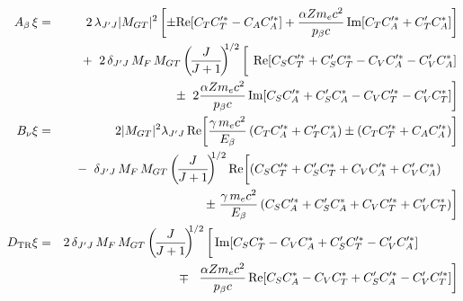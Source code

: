 \begin{eqnarray}
    \Abeta \, \xi &=& 
    	2\, \lambda_{J^\prime J} |M_{GT}|^2 \left[ \pm \textrm{Re}\!\left[ C_T C_T^{\prime *} - C_A C_A^{\prime *} \right] + \frac{\alpha Z \me c^2}{\pbeta c} \,\textrm{Im}\!\left[ C_T C_A^{\prime *} + C_T^\prime C_A^* \right] \right] 
		\nonumber \\ && + \;\; 
		2\, \delta_{J^\prime J} \, M_F\,M_{GT} \left(\! \frac{J}{J+1} \! \right)^{\!\!\! 1/2} \left[ \phantom{\frac{1}{1}\!\!\!} \,\textrm{Re} \! \left[ C_S C_T^{\prime *} +  C_S^\prime C_T^* - C_V C_A^{\prime *} - C_V^\prime C_A^* \right] 
		\right.
		\nonumber \\ && \pm \;
		\left.
		2 \frac{\alpha Z \me c^2}{\pbeta c} \,\textrm{Im}\!\left[ C_S C_A^{\prime *} + C_S^\prime C_A^* - C_V C_T^{\prime *} -C_V^\prime C_T^* \right] \right]
		\label{eq:jtw_Abetaxi}
	\\
	\Bnu \xi &=& 
		2 |M_{GT}|^2 \lambda_{J^\prime J}  \, \textrm{Re}\!\left[ \frac{\gamma \, \me c^2 }{\Ebeta}
		\left( C_T C_A^{\prime *} + C_T^\prime C_A^* \right) 
		\pm \left( C_T C_T^{\prime *} + C_A C_A^{\prime * }\right) \right]
		\nonumber \\
		&& - \;\; \delta_{J^\prime J} \, M_F\,M_{GT} \left(\! \frac{J}{J+1} \!\right)^{\!\!\! 1/2} 
		\textrm{Re} \! \left[ \left( C_S C_T^{\prime *} + C_S^\prime C_T^* + C_V C_A^{\prime *} + C_V^\prime C_A^* \right)
			\phantom{\frac{\me c^2}{\Ebeta } \!\!\!\! \!\!\!\! } \right.
		\nonumber \\ && \pm 
		\left. 
		\frac{\gamma \, \me c^2}{\Ebeta}  \left( C_S C_A^{\prime *} + C_S^\prime C_A^* + C_V C_T^{\prime *} + C_V^\prime C_T^* \right)  
		\right]
		\label{eq:jtw_Bnuxi}
	\\
	\DTR \xi &=&
		2 \, \delta_{J^\prime J} \, M_F\,M_{GT} \left(\! \frac{J}{J+1} \!\right)^{\!\!\! 1/2} \left[ \,
		\textrm{Im}\!\left[ C_S C_T^* - C_V C_A^* + C_S^\prime C_T^{\prime *} - C_V^\prime C_A^{\prime *} \right] 
			\phantom{\frac{\alpha Z \me}{\pbeta}} \right.
		\nonumber \\
		&& \mp \;\; \left.
		\frac{\alpha Z \me c^2}{\pbeta c} \, \textrm{Re}\!\left[ C_S C_A^* - C_V C_T^* + C_S^\prime C_A^{\prime *} - C_V^\prime C_T^{\prime *} \right] \right]
		\label{eq:jtw_DTRxi}
\end{eqnarray}
%
% 
%


























